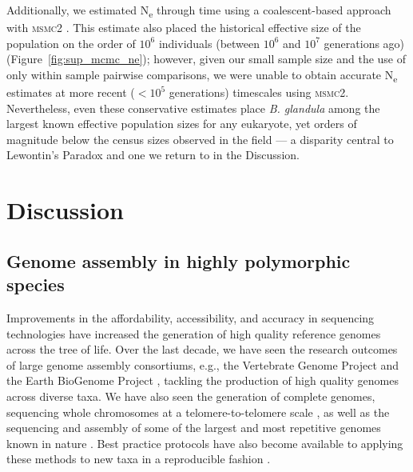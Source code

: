 \documentclass[11pt]{article}
\newcommand{\bgla}{\textit{B. glandula}\xspace}
\newcommand{\Ne}{N\textsubscript{e}\xspace}
\begin{document}
Additionally, we estimated \Ne{} through time using a coalescent-based
approach with \textsc{msmc2} \citep{dutheil_msmc_2020}. This estimate also placed
the historical effective size of the population on the order of $10^{6}$ individuals
(between $10^{6}$ and $10^{7}$ generations ago) (Figure~\ref{fig:sup_mcmc_ne});
however, given our small sample size and the use of only within sample pairwise
comparisons, we were unable to obtain accurate \Ne{} estimates at more recent
($<10^{5}$ generations) timescales using \textsc{msmc2}.
Nevertheless, even these conservative estimates place \bgla{} among the
largest known effective population sizes for any eukaryote, yet orders of
magnitude below the census sizes observed in the field --- a disparity
central to Lewontin's Paradox and one we return to in the Discussion.

\section*{Discussion}\label{sec:discussion}

\subsection*{Genome assembly in highly polymorphic species}


Improvements in the affordability, accessibility, and accuracy in sequencing
technologies have increased the generation of high quality reference genomes across
the tree of life. Over the last decade, we have seen the research outcomes of large
genome assembly consortiums, e.g., the Vertebrate Genome Project
\citep{rhie_towards_2021} and the Earth BioGenome Project
\citep{blaxter_earth_2025}, tackling the production of high quality genomes across
diverse taxa. We have also seen the generation of complete genomes, sequencing
whole chromosomes at a telomere-to-telomere scale \citep{nurk_complete_2022,
yoo_complete_2025}, as well as the sequencing and assembly of some of the largest
and most repetitive genomes known in nature \citep{campos-dominguez_genome_2025}.
Best practice protocols have also become available to applying these methods to new
taxa in a reproducible fashion \citep{lawniczak_best-practice_2025,li_genome_2024}.
\vspace{0.2cm}
\end{document}
